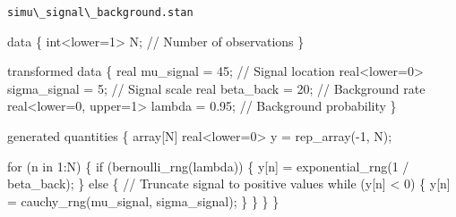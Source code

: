 \documentclass[
  letterpaper,
  DIV=11,
  numbers=noendperiod]{scrartcl}
\newenvironment{Shaded}{\begin{snugshade}}{\end{snugshade}}
\newcommand{\CommentTok}[1]{\textcolor[rgb]{0.37,0.37,0.37}{#1}}
\newcommand{\ControlFlowTok}[1]{\textcolor[rgb]{0.00,0.23,0.31}{#1}}
\newcommand{\DataTypeTok}[1]{\textcolor[rgb]{0.68,0.00,0.00}{#1}}
\newcommand{\DecValTok}[1]{\textcolor[rgb]{0.68,0.00,0.00}{#1}}
\newcommand{\FloatTok}[1]{\textcolor[rgb]{0.68,0.00,0.00}{#1}}
\newcommand{\KeywordTok}[1]{\textcolor[rgb]{0.00,0.23,0.31}{#1}}
\newcommand{\NormalTok}[1]{\textcolor[rgb]{0.00,0.23,0.31}{#1}}
\begin{document}
\begin{codelisting}

\caption{\texttt{simu\textbackslash\_signal\textbackslash\_background.stan}}

\begin{Shaded}
\begin{Highlighting}[]
\KeywordTok{data}\NormalTok{ \{}
  \DataTypeTok{int}\NormalTok{\textless{}}\KeywordTok{lower}\NormalTok{=}\DecValTok{1}\NormalTok{\textgreater{} N;      }\CommentTok{// Number of observations}
\NormalTok{\}}

\KeywordTok{transformed data}\NormalTok{ \{}
  \DataTypeTok{real}\NormalTok{ mu\_signal =  }\DecValTok{45}\NormalTok{;                 }\CommentTok{// Signal location}
  \DataTypeTok{real}\NormalTok{\textless{}}\KeywordTok{lower}\NormalTok{=}\DecValTok{0}\NormalTok{\textgreater{} sigma\_signal = }\DecValTok{5}\NormalTok{;       }\CommentTok{// Signal scale}
  \DataTypeTok{real}\NormalTok{ beta\_back = }\DecValTok{20}\NormalTok{;                  }\CommentTok{// Background rate}
  \DataTypeTok{real}\NormalTok{\textless{}}\KeywordTok{lower}\NormalTok{=}\DecValTok{0}\NormalTok{, }\KeywordTok{upper}\NormalTok{=}\DecValTok{1}\NormalTok{\textgreater{} lambda = }\FloatTok{0.95}\NormalTok{; }\CommentTok{// Background probability}
\NormalTok{\}}

\KeywordTok{generated quantities}\NormalTok{ \{}
  \DataTypeTok{array}\NormalTok{[N] }\DataTypeTok{real}\NormalTok{\textless{}}\KeywordTok{lower}\NormalTok{=}\DecValTok{0}\NormalTok{\textgreater{} y = rep\_array({-}}\DecValTok{1}\NormalTok{, N);}

  \ControlFlowTok{for}\NormalTok{ (n }\ControlFlowTok{in} \DecValTok{1}\NormalTok{:N) \{}
    \ControlFlowTok{if}\NormalTok{ (bernoulli\_rng(lambda)) \{}
\NormalTok{      y[n] = exponential\_rng(}\DecValTok{1}\NormalTok{ / beta\_back);}
\NormalTok{    \} }\ControlFlowTok{else}\NormalTok{ \{}
      \CommentTok{// Truncate signal to positive values}
      \ControlFlowTok{while}\NormalTok{ (y[n] \textless{} }\DecValTok{0}\NormalTok{) \{}
\NormalTok{        y[n] = cauchy\_rng(mu\_signal, sigma\_signal);}
\NormalTok{      \}}
\NormalTok{    \}}
\NormalTok{  \}}
\NormalTok{\}}
\end{Highlighting}
\end{Shaded}

\end{codelisting}
\end{document}
